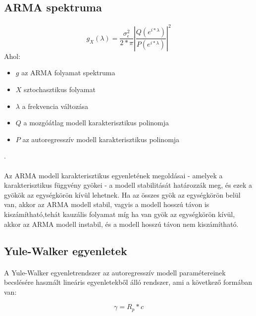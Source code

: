 \documentclass[11pt,a4paper]{article}
\begin{document}
				\subsection{ARMA spektruma}
					\paragraph{}
						$$g_X(\lambda) = \dfrac{\sigma^2_\epsilon}{2*\pi} \left| \dfrac{Q(e^{i*\lambda})}{P(e^{i*\lambda})} \right|^2$$
						Ahol:
						\begin{itemize}
							\item $g$ az ARMA folyamat spektruma
							\item $X$ sztochasztikus folyamat
							\item $\lambda$ a frekvencia változása
							\item $Q$ a mozgóátlag modell karakterisztikus polinomja
							\item $P$ az autoregresszív modell karakterisztikus polinomja
						\end{itemize}.
					\paragraph{}
						Az ARMA modell karakterisztikus egyenletének megoldásai - amelyek a karakterisztikus függvény gyökei - a modell stabilitását határozzák meg, és ezek a gyökök az egységkörön kívül lehetnek. Ha az összes gyök az egységkörön belül van, akkor az ARMA modell stabil, vagyis a modell hosszú távon is kiszámítható,tehát kauzális folyamat míg ha van gyök az egységkörön kívül, akkor az ARMA modell instabil, és a modell hosszú távon nem kiszámítható.
				\subsection{Yule-Walker egyenletek}
					\paragraph{}
						A Yule-Walker egyenletrendszer az autoregresszív modell paramétereinek becslésére használt lineáris egyenletekből álló rendszer, ami a következő formában van:
						
						$$\gamma = R_p * c$$
						
\end{document}

